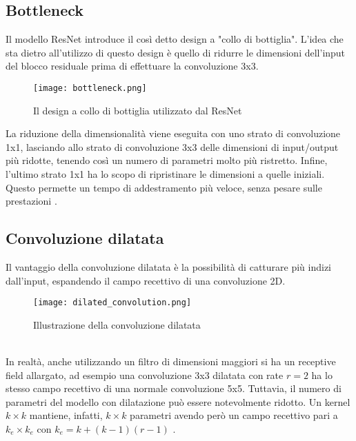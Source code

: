 \subsection{Bottleneck}
Il modello ResNet introduce il così detto design a "collo di bottiglia". L'idea che sta dietro all'utilizzo di questo design è quello di ridurre le dimensioni dell'input del blocco residuale prima di effettuare la convoluzione 3x3.
\begin{figure}[ht]
    \centering
    \texttt{[image: bottleneck.png]}
    \caption[Bottleneck]{Il design a collo di bottiglia utilizzato dal  ResNet}
\end{figure}
La riduzione della dimensionalità viene eseguita con uno strato di convoluzione 1x1, lasciando allo strato di convoluzione 3x3 delle dimensioni di input/output più ridotte, tenendo così un numero di parametri molto più ristretto. Infine, l'ultimo strato 1x1 ha lo scopo di ripristinare le dimensioni a quelle iniziali. Questo permette un tempo di addestramento più veloce, senza pesare sulle prestazioni \cite{resnet}.

\subsection{Convoluzione dilatata}
Il vantaggio della convoluzione dilatata è la possibilità di catturare più indizi dall'input, espandendo il campo recettivo di una convoluzione 2D.
\begin{figure}[ht]
    \centering
    \texttt{[image: dilated\_convolution.png]}
    \caption[Convoluzione dilatata]{Illustrazione della convoluzione dilatata}
\end{figure}\\
In realtà, anche utilizzando un filtro di dimensioni maggiori si ha un receptive field allargato, ad esempio una convoluzione 3x3 dilatata con rate $r=2$ ha lo stesso campo recettivo di una normale convoluzione 5x5. Tuttavia, il numero di parametri del modello con dilatazione può essere notevolmente ridotto. Un kernel $k\times k$ mantiene, infatti, $k\times k$ parametri avendo però un campo recettivo pari a $k_e\times k_e$ con $k_e=k+(k-1)(r-1)$ \cite{dilatedconvolution}.

